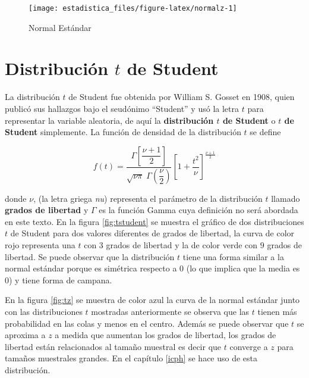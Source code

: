 \documentclass[]{book}
\begin{document}
\begin{figure}[h]

{\centering \texttt{[image: estadistica\_files/figure-latex/normalz-1]} 

}

\caption{Normal Estándar}\label{fig:normalz}
\end{figure}

\hypertarget{distribucion-t-de-student}{%
\section{\texorpdfstring{Distribución \(t\) de Student}{Distribución t de Student}}\label{distribucion-t-de-student}}

La distribución \(t\) de Student fue obtenida por William S. Gosset en 1908, quien publicó sus hallazgos bajo el seudónimo ``Student'' y usó la letra \(t\) para representar la variable aleatoria, de aquí la \textbf{distribución \(t\) de Student} o \textbf{\(t\) de Student} simplemente. La función de densidad de la distribución \(t\) se define

\begin{equation}
f\left(t\right)=\dfrac{\Gamma\left[\dfrac{\nu+1}{2}\right]}{\sqrt{\nu \pi} \; \Gamma\left(\dfrac{\nu}{2}\right)}\left[1 + \dfrac{t^2}{\nu} \right]^{\frac{\nu+1}{2}}
\label{eq:studentpdf}
\end{equation}

donde \(\nu\), (la letra griega \emph{nu}) representa el parámetro de la distribución \(t\) llamado \textbf{grados de libertad} y \(\Gamma\) es la función Gamma cuya definición no será abordada en este texto.
En la figura \ref{fig:tstudent} se muestra el gráfico de dos distribuciones \(t\) de Student para dos valores diferentes de grados de libertad, la curva de color rojo representa una \(t\) con 3 grados de libertad y la de color verde con \(9\) grados de libertad. Se puede observar que la distribución \(t\) tiene una forma similar a la normal estándar porque es simétrica respecto a \(0\) (lo que implica que la media es \(0\)) y tiene forma de campana.

En la figura \ref{fig:tz} se muestra de color azul la curva de la normal estándar junto con las distribuciones \(t\) mostradas anteriormente se observa que las \(t\) tienen más probabilidad en las colas y menos en el centro. Además se puede observar que \(t\) se aproxima a \(z\) a medida que aumentan los grados de libertad, los grados de libertad están relacionados al tamaño muestral es decir que \(t\) converge a \(z\) para tamaños muestrales grandes. En el capítulo \ref{icph} se hace uso de esta distribución.
\end{document}
